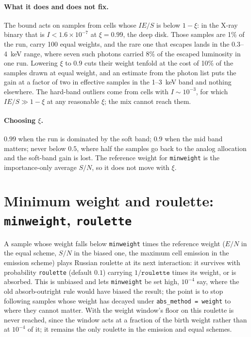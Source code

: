 \documentclass[11pt]{article}
\newcommand{\key}[1]{\texttt{#1}}
\begin{document}
\paragraph{What it does and does not fix.} The bound acts on samples from cells whose
$I E/S$ is below $1-\xi$: in the X-ray binary that is $I < 1.6\times10^{-7}$ at
$\xi = 0.99$, the deep disk. Those samples are 1\% of the run, carry 100 equal weights,
and the rare one that escapes lands in the 0.3--4~keV range, where seven such photons
carried 8\% of the escaped luminosity in one run. Lowering $\xi$ to $0.9$ cuts their
weight tenfold at the cost of 10\% of the samples drawn at equal weight, and an estimate
from the photon list puts the gain at a factor of two in effective samples in the
1--3~keV band and nothing elsewhere. The hard-band outliers come from cells with
$I \sim 10^{-3}$, for which $I E/S \gg 1-\xi$ at any reasonable $\xi$; the mix cannot
reach them.

\paragraph{Choosing $\xi$.} $0.99$ when the run is dominated by the soft band; $0.9$ when
the mid band matters; never below $0.5$, where half the samples go back to the analog
allocation and the soft-band gain is lost. The reference weight for \key{minweight} is
the importance-only average $S/N$, so it does not move with $\xi$.

\section{Minimum weight and roulette: \key{minweight}, \key{roulette}}

A sample whose weight falls below \key{minweight} times the reference weight ($E/N$ in
the equal scheme, $S/N$ in the biased one, the maximum cell emission in the emission
scheme) plays Russian roulette at its next interaction: it survives with probability
\key{roulette} (default $0.1$) carrying $1/\key{roulette}$ times its weight, or is
absorbed. This is unbiased and lets \key{minweight} be set high, $10^{-4}$ say, where
the old absorb-outright rule would have biased the result; the point is to stop
following samples whose weight has decayed under \key{abs\_method = weight} to where
they cannot matter. With the weight window's floor on this roulette is never reached,
since the window acts at a fraction of the birth weight rather than at $10^{-4}$ of it;
it remains the only roulette in the emission and equal schemes.
\end{document}
